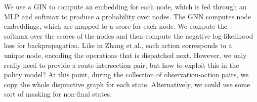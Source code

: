 \documentclass[a4paper]{article}
\theoremstyle{definition}
\theoremstyle{plain}
\begin{document}
We use a GIN to compute an embedding for each node, which is fed through an MLP
and softmax to produce a probability over nodes. The GNN computes node
embeddings, which are mapped to a score for each node. We compute the softmax
over the scores of the nodes and then compute the negative log likelihood loss
for backpropagation.
%
Like in Zhang et al., each action corresponds to a unique node, encoding the
operations that is dispatched next. However, we only really need to provide a
route-intersection pair, but how to exploit this in the policy model?
%
At this point, during the collection of observation-action pairs, we copy the
whole disjunctive graph for each state. Alternatively, we could use some sort of
masking for non-final states.





\end{document}
